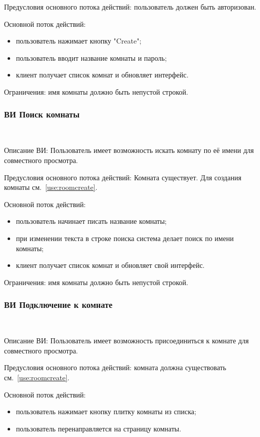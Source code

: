 Предусловия основного потока действий: пользователь должен быть авторизован.
 
Основной поток действий:
\begin{itemize}
   \item пользователь нажимает кнопку "Create";
   \item пользователь вводит название комнаты и пароль;
   \item клиент получает список комнат и обновляет интерфейс.
\end{itemize}
 
Ограничения: имя комнаты должно быть непустой строкой.
 
\subsubsection{ВИ Поиск комнаты}~\par
Описание ВИ: Пользователь имеет возможность искать комнату по её имени для совместного просмотра.
 
Предусловия основного потока действий: Комната существует. Для создания комнаты см.~\ref{use:roomcreate}.
 
Основной поток действий:
\begin{itemize}
   \item пользователь начинает писать название комнаты;
   \item при изменении текста в строке поиска система делает поиск по имени комнаты;
   \item клиент получает список комнат и обновляет свой интерфейс.
\end{itemize}
 
Ограничения: имя комнаты должно быть непустой строкой.

\subsubsection{ВИ Подключение к комнате}~\par
\label{use:join}
Описание ВИ: Пользователь имеет возможность присоединиться к комнате для совместного просмотра.
 
Предусловия основного потока действий: комната должна существовать см.~\ref{use:roomcreate}.
 
Основной поток действий:
\begin{itemize}
   \item пользователь нажимает кнопку плитку комнаты из списка;
   \item пользователь перенаправляется на страницу комнаты.
\end{itemize}
 
